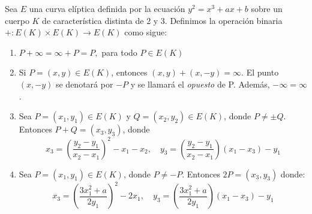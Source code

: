 \begin{definicion}
\label{def:ley de grupo}
Sea $E$ una curva elíptica definida por la ecuación $y^2 = x^3 + a x + b$ sobre un cuerpo $K$ de característica distinta de 2 y 3. Definimos la operación binaria $+: E(K) \times E(K) \to E(K)$ como sigue:
\begin{enumerate}[label=\alph*)]
	\item $P + \infty = \infty + P = P,$ para todo $P \in E(K)$
	\item Si $P = (x, y) \in E(K)$, entonces $(x, y) + (x, -y) = \infty$. El punto $(x, -y)$ se denotará por $-P$ y se llamará el \emph{opuesto} de P. Además, $- \infty = \infty$.
	\item Sea $P = (x_1, y_1) \in E(K)$ y $Q = (x_2, y_2) \in E(K)$, donde $P \neq \pm Q$. Entonces $P + Q = (x_3, y_3)$, donde
	$$
	x_3 = \left(\frac{y_2 - y_1}{x_2 - x_1}\right)^2 - x_1 - x_2, \quad
	y_3 = \left(\frac{y_2 - y_1}{x_2 - x_1}\right) (x_1 - x_3) - y_1
	$$
	\item Sea $P = (x_1, y_1) \in E(K)$, donde $P \neq  -P$. Entonces $2 P = (x_3, y_3)$ donde:
	$$
	x_3 = \left(\frac{3 x_1^2 + a}{2 y_1}\right)^2 - 2 x_1, \quad
	y_3 = \left(\frac{3 x_1^2 + a}{2 y_1}\right) (x_1 - x_3) - y_1
	$$
\end{enumerate}
\end{definicion}
